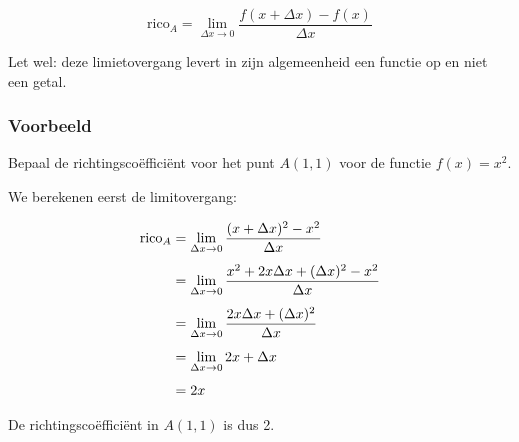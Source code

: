 \documentclass{article}
\begin{document}
\begin{equation}
\textrm{rico}_A = \lim\limits_{\Delta x \rightarrow 0} \frac{f(x+\Delta x) - f(x)}{\Delta x}
\end{equation}

Let wel: deze limietovergang levert in zijn algemeenheid een functie op en niet een getal.



\subsubsection*{Voorbeeld}

Bepaal de richtingscoëfficiënt voor het punt $A(1,1)$ voor de functie $f(x) = x^2$.

We berekenen eerst de limitovergang:

\begin{equation}
\jot=7pt
\begin{split}
\mathrm{rico}_A &= \lim\limits_{\Delta x \rightarrow 0}\frac{(x+\Delta x)^2 - x^2}{\Delta x} \\
 &= \lim\limits_{\Delta x \rightarrow 0}\frac{x^2 + 2x\Delta x + (\Delta x)^2 - x^2}{\Delta x} \\
 &= \lim\limits_{\Delta x \rightarrow 0}\frac{2x\Delta x + (\Delta x)^2}{\Delta x} \\
 &= \lim\limits_{\Delta x \rightarrow 0}2x + \Delta x \\
 &= 2x 
\end{split}
\end{equation}

De richtingscoëfficiënt in $A(1,1)$ is dus 2.
\end{document}
